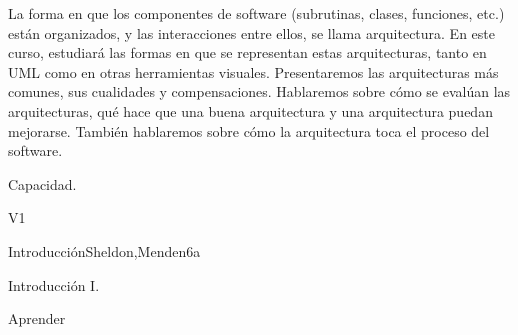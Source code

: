 
\begin{syllabus}


\begin{justification}
 La forma en que los componentes de software (subrutinas, clases, funciones, etc.) están organizados, y las interacciones entre ellos, se llama arquitectura. En este curso, estudiará las formas en que se representan estas arquitecturas, tanto en UML como en otras herramientas visuales. Presentaremos las arquitecturas más comunes, sus cualidades y compensaciones. Hablaremos sobre cómo se evalúan las arquitecturas, qué hace que una buena arquitectura y una arquitectura puedan mejorarse. También hablaremos sobre cómo la arquitectura toca el proceso del software.
   \end{justification}
   
   \begin{goals}
   \item Capacidad.
   \end{goals}
   
   \begin{outcomes}{V1}
      \item {}
   \end{outcomes}
   
   \begin{unit}{Introducción}{}{Sheldon,Menden}{6}{a}
   \begin{topics}
         \item Introducción I.
      \end{topics}
   
      \begin{learningoutcomes}
         \item Aprender
      \end{learningoutcomes}
   \end{unit}
   
   
   
   
   
   
   \begin{coursebibliography}
   \end{coursebibliography}
   
   \end{syllabus}
   
